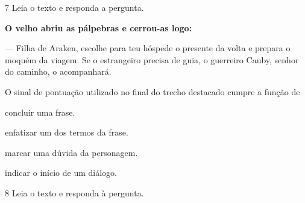 \num{7} Leia o texto e responda a pergunta.

\begin{myquote}
\textbf{O velho abriu as pálpebras e cerrou-as logo:}

--- Filha de Araken, escolhe para teu hóspede o presente da volta e
prepara o moquém da viagem. Se o estrangeiro precisa de guia, o
guerreiro Cauby, senhor do caminho, o acompanhará.

\end{myquote}

O sinal de pontuação utilizado no final do trecho destacado cumpre a
função de

\begin{escolha}
  \item concluir uma frase.

  \item enfatizar um dos termos da frase.

  \item marcar uma dúvida da personagem.

  \item indicar o início de um diálogo.
\end{escolha}

\num{8} Leia o texto e responda à pergunta.

